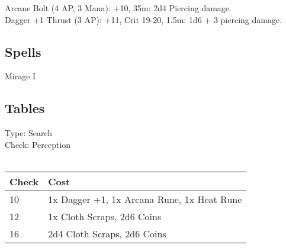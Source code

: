 Arcane Bolt (4 AP, 3 Mana): +10, 35m: 2d4 Piercing damage.\\

Dagger +1 Thrust (3 AP): +11, Crit 19-20, 1.5m: 1d6 + 3 piercing damage.\\

\subsection{Spells}
Mirage I\\

\subsection{Tables}
Type: Search\\
Check: Perception\\
\\
\begin{minipage}{0.8\textwidth}
	\begin{tabular}{|l | l|}
		\hline
		Check & Cost\\
		\hline
		10 & 1x Dagger +1, 1x Arcana Rune, 1x Heat Rune\\
		12 & 1x Cloth Scraps, 2d6 Coins\\
		16 & 2d4 Cloth Scraps, 2d6 Coins\\
		\hline
	\end{tabular}
\end{minipage}
\pagebreak